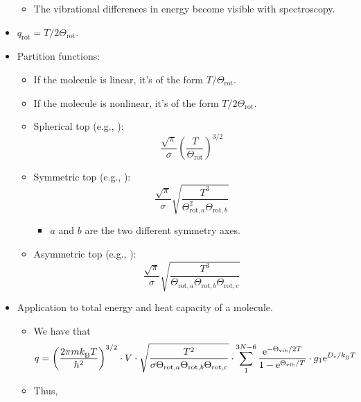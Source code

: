 \documentclass[../notes.tex]{subfiles}
\begin{document}
\begin{itemize}
    \begin{itemize}
        \item The vibrational differences in energy become visible with spectroscopy.
    \end{itemize}
    \item $q_\text{rot}=T/2\Theta_\text{rot}$.
    \item Partition functions:
    \begin{itemize}
        \item If the molecule is linear, it's of the form $T/\Theta_\text{rot}$.
        \item If the molecule is nonlinear, it's of the form $T/2\Theta_\text{rot}$.
        \item Spherical top (e.g., ):
        \begin{equation*}
            \frac{\sqrt{\pi}}{\sigma}\left( \frac{T}{\Theta_\text{rot}} \right)^{3/2}
        \end{equation*}
        \item Symmetric top (e.g., ):
        \begin{equation*}
            \frac{\sqrt{\pi}}{\sigma}\sqrt{\frac{T^3}{\Theta_{\text{rot},a}^2\Theta_{\text{rot},b}}}
        \end{equation*}
        \begin{itemize}
            \item $a$ and $b$ are the two different symmetry axes.
        \end{itemize}
        \item Asymmetric top (e.g., ):
        \begin{equation*}
            \frac{\sqrt{\pi}}{\sigma}\sqrt{\frac{T^3}{\Theta_{\text{rot},a}\Theta_{\text{rot},b}\Theta_{\text{rot},c}}}
        \end{equation*}
    \end{itemize}
    \item Application to total energy and heat capacity of a molecule.
    \begin{itemize}
        \item We have that
        \begin{equation*}
            q = \left( \frac{2\pi m\kB T}{h^2} \right)^{3/2}\cdot V\cdot\sqrt{\frac{T^2}{\sigma\Theta_{\text{rot},a}\Theta_{\text{rot},b}\Theta_{\text{rot},c}}}\cdot\sum_1^{3N-6}\frac{\e[-\Theta_\text{vib}/2T]}{1-\e[\Theta_\text{vib}/T]}\cdot g_1\e[D_e/\kB T]
        \end{equation*}
        \item Thus,

\end{itemize}
\end{itemize}
\end{document}
